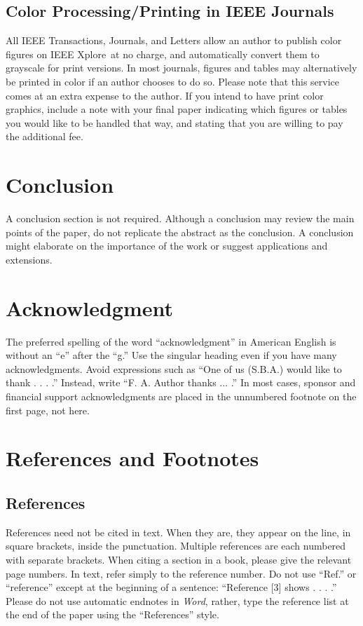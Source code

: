 \subsection{Color Processing/Printing in IEEE Journals}
All IEEE Transactions, Journals, and Letters allow an author to publish 
color figures on IEEE Xplore\textregistered\ at no charge, and automatically 
convert them to grayscale for print versions. In most journals, figures and 
tables may alternatively be printed in color if an author chooses to do so. 
Please note that this service comes at an extra expense to the author. If 
you intend to have print color graphics, include a note with your final 
paper indicating which figures or tables you would like to be handled that 
way, and stating that you are willing to pay the additional fee.


\section{Conclusion}

A conclusion section is not required. Although a conclusion may review the main points of the paper, do not replicate the abstract as the conclusion. A conclusion might elaborate on the importance of the work or suggest applications and extensions. 

\section*{Acknowledgment}

The preferred spelling of the word ``acknowledgment'' in American English is without an ``e'' after the ``g.'' Use the singular heading even if you have many acknowledgments. Avoid expressions such as ``One of us (S.B.A.) would like to thank . . . .'' Instead, write “F. A. Author thanks ... .” In most cases, sponsor and financial support acknowledgments are placed in the unnumbered footnote on the first page, not here.

\section*{References and Footnotes}

\subsection{References}

References need not be cited in text. When they are, they appear on the line, in square brackets, inside the punctuation.  Multiple references are each numbered with separate brackets. When citing a section in a book, please give the relevant page numbers. In text, refer simply to the reference number. Do not use ``Ref.'' or ``reference'' except at the beginning of a sentence: ``Reference [3] shows . . . .'' Please do not use automatic endnotes in {\em Word}, rather, type the reference list at the end of the paper using the ``References'' style.

